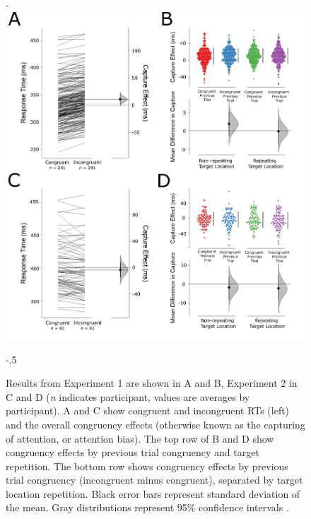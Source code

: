 \documentclass[issue,header,twocolumn,empirical, authordate,10pt]{jote-new-article}
\begin{document}
\begin{figure}[b!]

\begin{adjustwidth}{-\fullwidthlen}{}
  \includegraphics[width=\linewidth]{Figure2.png}
\label{fig:fig2}
\end{adjustwidth}
  \captionsetup{width=\dimexpr \linewidth + \fullwidthlen}
 \begin{adjustwidth}{-.5\fullwidthlen}{}
 \caption{
Results from Experiment 1 are shown in A and B, Experiment 2 in C and D (\emph{n} indicates participant, values are averages by participant). A and C show congruent and incongruent RTs (left) and the overall congruency effects (otherwise known as the capturing of attention, or attention bias). The top row of B and D show congruency effects by previous trial congruency and target repetition. The bottom row shows congruency effects by previous trial congruency (incongruent minus congruent), separated by target location repetition. Black error bars represent standard deviation of the mean. Gray distributions represent 95\% confidence intervals \parencite{Ho2019}.  }
\end{adjustwidth}


\end{figure}
\end{document}
